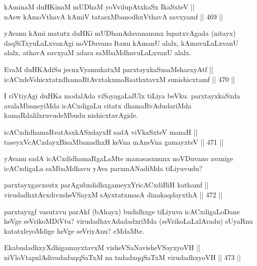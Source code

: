 \begin{shl}
kAminaM duHKinaM mUDhaM yoV\s vilupAtxkaSx IkaSxteV || \\
nAsw kAmoV\s thavA kAmiV tatasxMbanodhxV\s thavA savxyamf \hfill || 469 ||  
\end{shl}

\begin{artha}
yAvanu kAmi matutx duHKi mUDhanAdavananunx lupatxvAgada (nitayx)
daqSiTxyuLaLxvanAgi noVDuvano Itanu kAmanU alalx, kAmavuLaLxvanU
alalx, athavA savxyaM adara saMbaMdhavuLaLxvanU alalx.
\end{artha}

\begin{shl}
EvaM duHKAdiSu jecnxVyamukatxM parxtayxkaSxsaMsharxyAtf || \\
icACxdeVshicxtatxdhamaRtAvxtakxmaRsathxtavxM sunishicxtamf \hfill || 470 ||  
\end{shl}

\begin{artha}
I riVtiyAgi duHKa modalAda viSayagaLalUlx tiLiya beVku. parxtayxkaSxda
avalaMbaneyiMda icACxdigaLu citatx dhamaRvAdudariMda
kamaRdalilxruvudeMbudu nishicxtavAgide.
\end{artha}

\begin{shl}
icACxdidhamaRvatAsxkASxdayxH sadA viVkaSxteV manaH || \\
taseyxVcACxdayxBisaMbanadhxH keVna mAneVna gamayxteV \hfill || 471 ||  
\end{shl}

\begin{artha}
yAvanu sadA icACxdidhamaRgaLaMte manasasxnunx noVDuvano avanige
icACxdigaLa saMbaMdhavu yAva parxmANadiMda tiLiyuvudu?
\end{artha}

\begin{shl}
parxtayxgavxsutx parAgubxdidhxgameyxYricACxdiBiH kathamf || \\
virudadhxtAvxdivxsheVSayxM sAyxtatxmasA dinakaqdayxthA \hfill || 472 ||  
\end{shl}

\begin{artha}
parxtayxgf vasutxvu parAkf (bAhayx) budidhxge tiLiyuva icACxdigaLoDane
heVge seVrikoMDiVtu? virudadhxvAdadadxriMda (seVrikoLaLxlAradu)
sUyaRnu katatxleyoMdige heVge seVriyAnu? eMdaMte.
\end{artha}

\begin{shl}
EkabudadhxyXdhigamayxtavxM visheVSaNavisheVSayxyoVH || \\
niVloVtapxlAdivadadxqqSaTxM na tadadxqqSaTxM virudadhxyoVH \hfill || 473 ||  
\end{shl}

